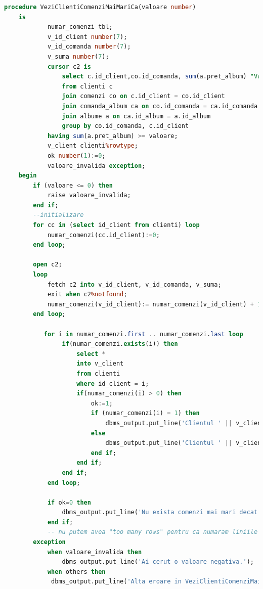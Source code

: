 \documentclass{article}
\begin{document}
\begin{lstlisting}[language=SQL, title=Cerinta 13]
    procedure VeziClientiComenziMaiMariCa(valoare number)
    is
            numar_comenzi tbl;
            v_id_client number(7);
            v_id_comanda number(7);
            v_suma number(7);
            cursor c2 is
                select c.id_client,co.id_comanda, sum(a.pret_album) "Valoare comanda"
                from clienti c 
                join comenzi co on c.id_client = co.id_client
                join comanda_album ca on co.id_comanda = ca.id_comanda
                join albume a on ca.id_album = a.id_album
                group by co.id_comanda, c.id_client
            having sum(a.pret_album) >= valoare;  
            v_client clienti%rowtype;
            ok number(1):=0;
            valoare_invalida exception;
    begin
        if (valoare <= 0) then
            raise valoare_invalida;
        end if;
        --initializare
        for cc in (select id_client from clienti) loop
            numar_comenzi(cc.id_client):=0;
        end loop;
        
        open c2;
        loop
            fetch c2 into v_id_client, v_id_comanda, v_suma;
            exit when c2%notfound;
            numar_comenzi(v_id_client):= numar_comenzi(v_id_client) + 1;
        end loop;
        
           for i in numar_comenzi.first .. numar_comenzi.last loop
                if(numar_comenzi.exists(i)) then
                    select *
                    into v_client
                    from clienti
                    where id_client = i;
                    if(numar_comenzi(i) > 0) then
                        ok:=1;
                        if (numar_comenzi(i) = 1) then
                            dbms_output.put_line('Clientul ' || v_client.prenume || ' ' || v_client.nume || ' a plasat o comanda cu valoare > '|| valoare ||' lei');
                        else
                            dbms_output.put_line('Clientul ' || v_client.prenume || ' ' || v_client.nume || ' a plasat ' || numar_comenzi(i) ||' comenzi cu valoare >  '|| valoare ||' lei');
                        end if;        
                    end if;
                end if;
            end loop;
            
            if ok=0 then
                dbms_output.put_line('Nu exista comenzi mai mari decat aceasta valoare.');
            end if;
            -- nu putem avea "too many rows" pentru ca numaram liniile intr-un vector si afisam doar nr de linii
        exception
            when valoare_invalida then
                dbms_output.put_line('Ai cerut o valoare negativa.');
            when others then
             dbms_output.put_line('Alta eroare in VeziClientiComenziMaiMariCa');
    

\end{lstlisting}
\end{document}
